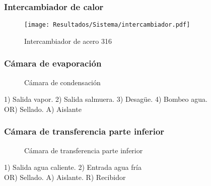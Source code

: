 \begin{frame}
	\frametitle{Intercambiador de calor}
	
	\begin{figure}
		\centering
		\texttt{[image: Resultados/Sistema/intercambiador.pdf]}
		\caption{Intercambiador de acero 316}
	\end{figure}
	
\end{frame}

\begin{frame}
	\frametitle{Cámara de evaporación}
	
	\begin{figure}
		\centering
		\caption{Cámara de condensación}
	\end{figure}
	
	1) Salida vapor. 2) Salida salmuera. 3) Desagüe. 4) Bombeo agua.\\
	
	OR) Sellado. A) Aislante
	
\end{frame}

\begin{frame}
	\frametitle{Cámara de transferencia parte inferior}
	
	\begin{figure}
		\centering
		\caption{Cámara de transferencia parte inferior}
	\end{figure}
	
	1) Salida agua caliente. 2) Entrada agua fría \\
	
	OR) Sellado. A) Aislante. R) Recibidor
	
\end{frame}

